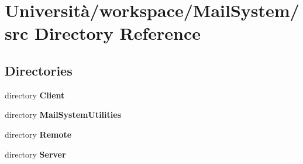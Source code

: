 \section{Università/workspace/\+Mail\+System/src Directory Reference}
\label{dir_e52cf9faa53b909f6faa34a830d2ded4}
\subsection*{Directories}
\begin{DoxyCompactItemize}
\item 
directory \textbf{ Client}
\item 
directory \textbf{ Mail\+System\+Utilities}
\item 
directory \textbf{ Remote}
\item 
directory \textbf{ Server}
\end{DoxyCompactItemize}
